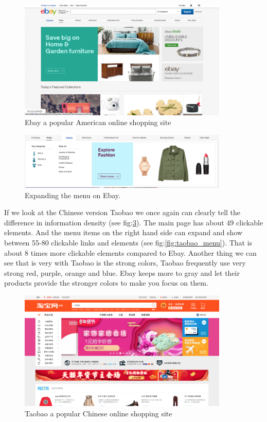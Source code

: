 \begin{figure}[h]
\centering
\includegraphics[width=100mm]{Images/ebay.png}
\decoRule
\caption[ebay]{Ebay a popular American online shopping site}
\label{fig:ebay}
\end{figure}

\begin{figure}[h]
\centering
\includegraphics[width=100mm]{Images/ebay_menu.png}
\decoRule
\caption[Ebay's menu bar]{Expanding the menu on Ebay.}
\label{fig:ebay_menu}
\end{figure}

If we look at the Chinese version Taobao we once again can clearly tell the difference in information density (see fig:\ref{fig:taobao}). The main page has about 49 clickable elements. And the menu items on the right hand side can expand and show between 55-80 clickable links and elements (see fig:\ref{fig:taobao_menu}). That is about 8 times more clickable elements compared to Ebay. Another thing we can see that is very with Taobao is the strong colors, Taobao frequently use very strong red, purple, orange and blue. Ebay keeps more to gray and let their products provide the stronger colors to make you focus on them. 

\begin{figure}[h]
\centering
\includegraphics[width=100mm]{Images/Taobao}
\decoRule
\caption[Taobao]{Taobao a popular Chinese online shopping site}
\label{fig:taobao}
\end{figure}

